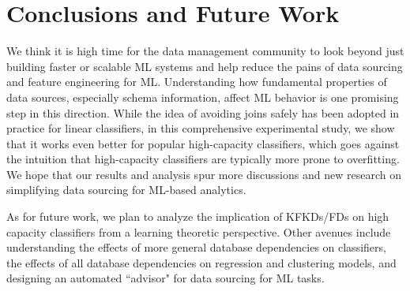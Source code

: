 \documentclass{vldb}
\begin{document}




\section{Conclusions and Future Work}
We think it is high time for the data management community to look beyond just building faster 
or scalable ML systems and help reduce the pains of data sourcing and feature engineering for ML. 
Understanding how fundamental properties of data sources, especially schema information, affect 
ML behavior is one promising step in this direction. 
While the idea of avoiding joins safely has been adopted  in practice for 
linear classifiers, in this comprehensive experimental study, we show that it works even better for 
popular high-capacity classifiers, which goes against the intuition that high-capacity classifiers 
are typically more prone to overfitting. We hope that our results and analysis spur more discussions 
and new research on simplifying data sourcing for ML-based analytics.

As for future work, we plan to analyze the implication of KFKDs/FDs on high capacity classifiers 
from a learning theoretic perspective. Other avenues include understanding the effects of more 
general database dependencies on classifiers, the effects of all database dependencies on 
regression and clustering models, and designing an automated ``advisor" for data sourcing for ML tasks.




\end{document}
